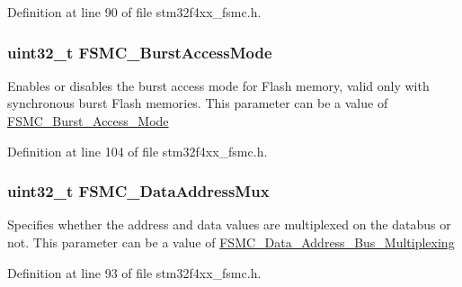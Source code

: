 Definition at line 90 of file stm32f4xx\-\_\-fsmc.\-h.

\hypertarget{struct_f_s_m_c___n_o_r_s_r_a_m_init_type_def_a39ac3b708e861c1137a72ed0f7ede7ae}{
\subsubsection[{F\-S\-M\-C\-\_\-\-Burst\-Access\-Mode}]{\setlength{\rightskip}{0pt plus 5cm}uint32\-\_\-t F\-S\-M\-C\-\_\-\-Burst\-Access\-Mode}}\label{struct_f_s_m_c___n_o_r_s_r_a_m_init_type_def_a39ac3b708e861c1137a72ed0f7ede7ae}
Enables or disables the burst access mode for Flash memory, valid only with synchronous burst Flash memories. This parameter can be a value of \hyperlink{group___f_s_m_c___burst___access___mode}{F\-S\-M\-C\-\_\-\-Burst\-\_\-\-Access\-\_\-\-Mode} 

Definition at line 104 of file stm32f4xx\-\_\-fsmc.\-h.

\hypertarget{struct_f_s_m_c___n_o_r_s_r_a_m_init_type_def_a543a5c385820244e5f3b5a96b3b79f46}{
\subsubsection[{F\-S\-M\-C\-\_\-\-Data\-Address\-Mux}]{\setlength{\rightskip}{0pt plus 5cm}uint32\-\_\-t F\-S\-M\-C\-\_\-\-Data\-Address\-Mux}}\label{struct_f_s_m_c___n_o_r_s_r_a_m_init_type_def_a543a5c385820244e5f3b5a96b3b79f46}
Specifies whether the address and data values are multiplexed on the databus or not. This parameter can be a value of \hyperlink{group___f_s_m_c___data___address___bus___multiplexing}{F\-S\-M\-C\-\_\-\-Data\-\_\-\-Address\-\_\-\-Bus\-\_\-\-Multiplexing} 

Definition at line 93 of file stm32f4xx\-\_\-fsmc.\-h.

